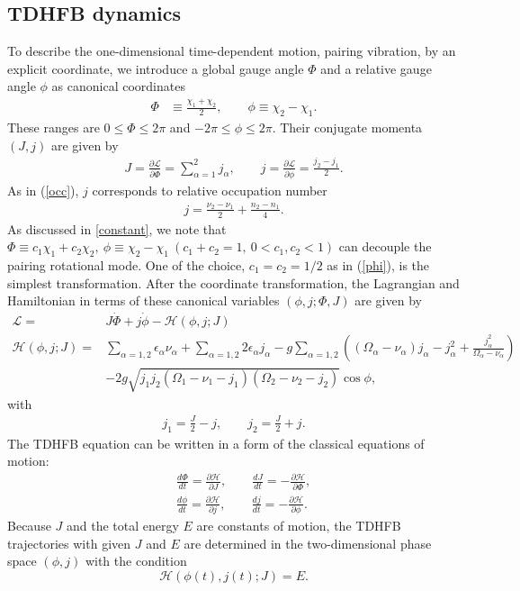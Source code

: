 \documentclass[11pt]{book} %
\begin{document}
\subsection{TDHFB dynamics}
To describe the one-dimensional time-dependent motion, pairing vibration, by an explicit coordinate, we introduce a global gauge angle $\Phi$ and a relative gauge angle $\phi$ as canonical coordinates
\begin{align}
  \Phi &\equiv \frac{\chi_1 + \chi_2}{2}, \quad\quad
  \phi\equiv \chi_2 - \chi_1.
\label{phi}
\end{align}
These ranges are $0\leq \Phi \leq 2\pi$ and $-2\pi \leq \phi \leq 2\pi$. 
Their conjugate momenta $(J,j)$ are given by
\begin{align}
	J = \frac{\partial\mathcal{L}}{\partial\dot{\Phi}} =  \sum_{\alpha=1}^2 j_{\alpha}, 
 \quad\quad
j = \frac{\partial\mathcal{L}}{\partial\dot{\phi}} = \frac{j_2 - j_1}{2}.
	\label{pi}
\end{align}
As in (\ref{occ}), $j$ corresponds to relative occupation number
\begin{align}
  j = \frac{\nu_{2}-\nu_{1}}{2} + \frac{n_{2}-n_{1}}{4} .
\end{align}
As discussed in \ref{constant}, we note that $\Phi \equiv c_1\chi_1 + c_2\chi_2, \ \phi\equiv \chi_2 - \chi_1 \ (c_1+c_2=1,\ 0<c_1,c_2<1)$ can decouple the pairing rotational mode. One of the choice, $c_1=c_2=1/2$ as in (\ref{phi}), is the simplest transformation.
After the coordinate transformation, the Lagrangian and Hamiltonian in terms of these canonical variables
$(\phi,j;\Phi,J)$ are given by
\begin{align}
	\mathcal{L} =& J\dot{\Phi} + j\dot{\phi} - \mathcal{H}(\phi,j;J) \label{Lagrangian2}\\
	\mathcal{H}(\phi,j;J)
	=& \sum_{\alpha=1,2} \epsilon_{\alpha}\nu_{\alpha} + \sum_{\alpha=1,2} 2\epsilon_{\alpha}j_{\alpha} - g\sum_{\alpha=1,2} \left( (\Omega_{\alpha}-\nu_{\alpha}) j_{\alpha} - j_{\alpha}^2 +\frac{j_{\alpha}^2}{\Omega_{\alpha}-\nu_{\alpha}} \right) \nonumber \\
	&- 2g\sqrt{j_1j_2(\Omega_{1}-\nu_{1}-j_{1})(\Omega_{2}-\nu_{2}-j_{2})}\cos{\phi} , 
\label{Hamiltonian2}
\end{align}
with 
\begin{align}
	j_1 = \frac{J}{2} - j, \quad\quad j_2 = \frac{J}{2} + j .
	\label{j_l}
\end{align}
The TDHFB equation can be written in a form of
the classical equations of motion:
\begin{eqnarray}
	&&\frac{d\Phi}{dt} = \frac{\partial\mathcal{H}}{\partial J} ,\quad\quad
\frac{dJ}{dt} = -\frac{\partial\mathcal{H}}{\partial \Phi} , \\
	&&\frac{d\phi}{dt} = \frac{\partial\mathcal{H}}{\partial j} ,\quad\quad
\frac{dj}{dt} = -\frac{\partial\mathcal{H}}{\partial \phi} .
\label{TDHFB_equation}
\end{eqnarray}
Because $J$ and the total energy $E$ are constants of motion, the TDHFB trajectories with given $J$ and $E$ are determined
in the two-dimensional phase space $(\phi,j)$ with the condition
\begin{equation}
  \mathcal{H}(\phi(t),j(t);J) = E.
  \label{contour}
\end{equation}
\end{document}
